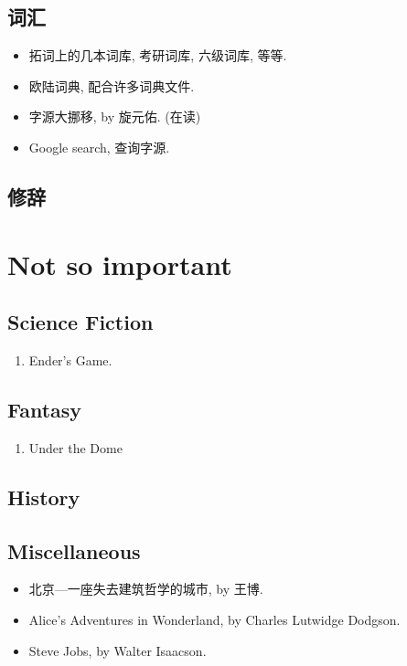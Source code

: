 \documentclass{article}
\begin{document}
\subsection{词汇}
\begin{itemize}
    \item 拓词上的几本词库, 考研词库, 六级词库, 等等.
    \item 欧陆词典, 配合许多词典文件.
    \item 字源大挪移, by 旋元佑. (在读)
    \item Google search, 查询字源.
\end{itemize}
\subsection{修辞}
\section{Not so important}
\subsection{Science Fiction}
\begin{enumerate}
    \item Ender's Game.
\end{enumerate}
\subsection{Fantasy}
\begin{enumerate}
    \item Under the Dome
\end{enumerate}
\subsection{History}

\subsection{Miscellaneous}
\begin{itemize}
    \item 北京---一座失去建筑哲学的城市, by 王博.
    \item Alice's Adventures in Wonderland, by Charles Lutwidge Dodgson.
    \item Steve Jobs, by Walter Isaacson.
\end{itemize}
\end{document}
